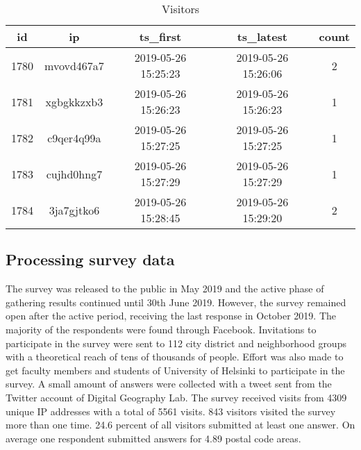 \begin{table}[!htbp]
    \begin{centering}
        \begin{tabular}{|c c c c c|} 
            \hline
            id & ip & ts\_first & ts\_latest & count \\ [0.5ex] 
            \hline\hline
            1780 & mvovd467a7 & 2019-05-26 15:25:23 & 2019-05-26 15:26:06 & 2 \\ [0.25ex] 
            \hline
            1781 & xgbgkkzxb3 & 2019-05-26 15:26:23 & 2019-05-26 15:26:23 & 1 \\ [0.25ex] 
            \hline
            1782 & c9qer4q99a & 2019-05-26 15:27:25 & 2019-05-26 15:27:25 & 1 \\ [0.25ex]
            \hline
            1783 & cujhd0hng7 & 2019-05-26 15:27:29 & 2019-05-26 15:27:29 & 1 \\ [0.25ex] 
            \hline
            1784 & 3ja7gjtko6 & 2019-05-26 15:28:45 & 2019-05-26 15:29:20 & 2 \\ [1ex]
            \hline
        \end{tabular}
        \caption{Visitors} \label{tab:visitortab}
    \end{centering}
\end{table}

\subsection{Processing survey data}
\justify
The survey was released to the public in May 2019 and the active phase of gathering results continued until 30th June 2019. However, the survey remained open after the active period, receiving the last response in October 2019. The majority of the respondents were found through Facebook. Invitations to participate in the survey were sent to 112 city district and neighborhood groups with a theoretical reach of tens of thousands of people. Effort was also made to get faculty members and students of University of Helsinki to participate in the survey. A small amount of answers were collected with a tweet sent from the Twitter account of Digital Geography Lab. The survey received visits from 4309 unique IP addresses with a total of 5561 visits. 843 visitors visited the survey more than one time. 24.6 percent of all visitors submitted at least one answer. On average one respondent submitted answers for 4.89 postal code areas.

